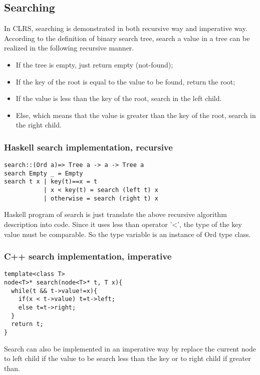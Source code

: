 \documentclass{article}
\begin{document}
\subsection{Searching}
In CLRS\cite{CLRS}, searching is demonstrated in both recursive way and 
imperative way. According to the definition of binary search tree, search
a value in a tree can be realized in the following recursive manner.

\begin{itemize}
\item If the tree is empty, just return empty (not-found);
\item If the key of the root is equal to the value to be found, 
return the root;
\item If the value is less than the key of the root, search in the left
child.
\item Else, which means that the value is greater than the key of the 
root, search in the right child.
\end{itemize}

\subsubsection*{Haskell search implementation, recursive}
\lstset{language=Haskell}
\begin{lstlisting}
search::(Ord a)=> Tree a -> a -> Tree a
search Empty _ = Empty
search t x | key(t)==x = t
           | x < key(t) = search (left t) x
           | otherwise = search (right t) x
\end{lstlisting}

Haskell program of search is just translate the above recursive algorithm
description into code. Since it uses less than operator '<', the type
of the key value must be comparable. So the type variable is an instance 
of Ord type class.

\subsubsection*{C++ search implementation, imperative}
\lstset{language=C++}
\begin{lstlisting}
template<class T>
node<T>* search(node<T>* t, T x){
  while(t && t->value!=x){
    if(x < t->value) t=t->left;
    else t=t->right;
  }
  return t;
}
\end{lstlisting}

Search can also be implemented in an imperative way by replace the current
node to left child if the value to be search less than the key or to right 
child if greater than.
\end{document}
